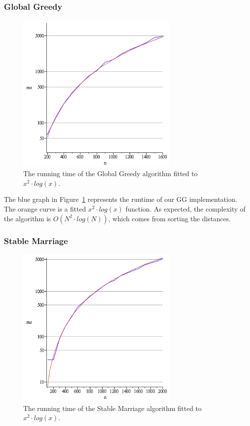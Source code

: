 \documentclass[a4paper,11pt]{article}
\begin{document}
\subsubsection{Global Greedy}

\begin{figure}[ht!]
\centering 
\includegraphics[width=80mm]{GG_runtime.png}
\caption{The running time of the Global Greedy algorithm fitted to $x^2 \cdot log(x)$.}
\label{gg} 
\end{figure}

The blue graph in Figure~\ref{gg} represents the runtime of our GG implementation. The orange curve is a fitted $x^2 \cdot log(x)$ function. As expected, the complexity of the algorithm is $O(N^{2} \cdot log(N))$, which comes from sorting the distances.

\subsubsection{Stable Marriage}

\begin{figure}[ht!]
\centering 
\includegraphics[width=80mm]{SM_runtime.png}
\caption{The running time of the Stable Marriage algorithm fitted to $x^2 \cdot log(x)$.}
\label{sm} 
\end{figure}
\end{document}
